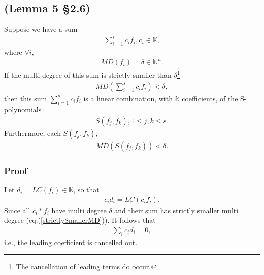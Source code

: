 \documentclass[11pt]{book}
\begin{document}
\subsection{(Lemma 5 \S2.6)}
\label{buchbergerLemma}
Suppose we have a sum
\begin{eqnarray}
\sum_{i=1}^s c_i f_i, c_i \in \mathbb{K}, 
\end{eqnarray}
where $\forall i$,
\begin{eqnarray*}
MD(f_i) = \delta \in \mathbb{N}^n.
\end{eqnarray*}
If the multi degree of this sum is strictly smaller than $\delta$\footnote{The cancellation of leading terms do occur.}
\begin{eqnarray}
\label{strictlySmallerMD}
MD\left( \sum_{i=1}^s c_i f_i \right) < \delta,
\end{eqnarray}
then this sum $\sum_{i=1}^s c_i f_i$ is a linear combination, with $\mathbb{K}$ coefficients, of the S-polynomials
\begin{eqnarray}
S(f_j, f_k), 1 \leq j, k \leq s.
\end{eqnarray}
Furthermore, each $S(f_j, f_k)$,
\begin{eqnarray}
MD\left( S(f_j, f_k) \right) < \delta.
\end{eqnarray}

\subsubsection{Proof}
Let $d_i = LC(f_i) \in \mathbb{K}$, so that
\begin{eqnarray}
c_i d_i = LC(c_i f_i).
\end{eqnarray}
Since all $c_i * f_i$ have multi degree $\delta$ and their sum has strictly smaller multi degree (eq.(\ref{strictlySmallerMD})).
It follows that
\begin{eqnarray}
\label{cidiequalzero}
\sum_i c_i d_i = 0,
\end{eqnarray}
i.e., the leading coefficient is cancelled out.
\end{document}
